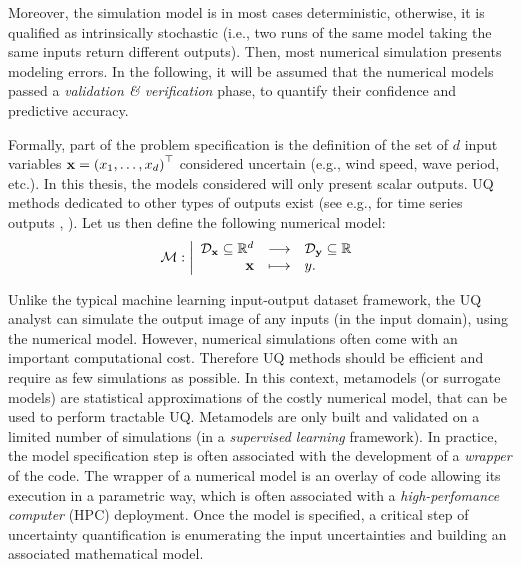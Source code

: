 Moreover, the simulation model is in most cases deterministic, otherwise, it is qualified as intrinsically stochastic (i.e., two runs of the same model taking the same inputs return different outputs).
Then, most numerical simulation presents modeling errors. 
In the following, it will be assumed that the numerical models passed a \textit{validation \& verification} phase, to quantify their confidence and predictive accuracy. 

Formally, part of the problem specification is the definition of the set of $d$ input variables ${\bf x} = \left(x_1, \dots, x_d\right)^\top$ considered uncertain (e.g., wind speed, wave period, etc.). 
In this thesis, the models considered will only present scalar outputs. 
UQ methods dedicated to other types of outputs exist (see e.g., for time series outputs \citet{lataniotis_2019}, ). 
Let us then define the following numerical model:
\begin{equation}
\mathcal{M} : \bigg|
    \begin{array}{rcl}
        \mathcal{D}_{{\bf x}} \subseteq \mathbb{R}^d & \longrightarrow & \mathcal{D}_{{\bf y}} \subseteq \mathbb{R} \\
        {\bf x} & \longmapsto & y.
    \end{array}
\end{equation}

Unlike the typical machine learning input-output dataset framework, the UQ analyst can simulate the output image of any inputs (in the input domain), using the numerical model. 
However, numerical simulations often come with an important computational cost. 
Therefore UQ methods should be efficient and require as few simulations as possible. 
In this context, metamodels (or surrogate models) are statistical approximations of the costly numerical model, that can be used to perform tractable UQ. 
Metamodels are only built and validated on a limited number of simulations (in a \textit{supervised learning} framework).
In practice, the model specification step is often associated with the development of a \textit{wrapper} of the code. 
The wrapper of a numerical model is an overlay of code allowing its execution in a parametric way, which is often associated with a \textit{high-perfomance computer} (HPC) deployment.  
Once the model is specified, a critical step of uncertainty quantification is enumerating the input uncertainties and building an associated mathematical model.


